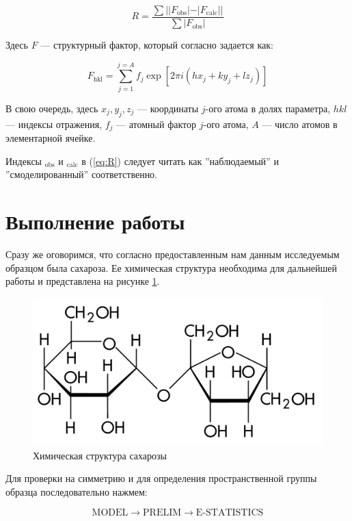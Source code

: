 \documentclass[a4paper, 12pt]{article}
\begin{document}
\begin{equation}
	R = \frac{\sum ||F_{\text{obs}}| - |F_{\text{calc}}||}{\sum |F_{\text{obs}}|}
	\label{eq:R}
\end{equation}

Здесь $F$ --- структурный фактор, который согласно \cite{Practicum} задается как:

\begin{equation}
	F_{\text{hkl}} = \sum_{j = 1}^{j = A} f_j \exp [2 \pi i (hx_{j} + ky_j + lz_j)]
\end{equation}

В свою очередь, здесь $x_j, y_j, z_j$ --- координаты $j$-ого атома в долях параметра, $hkl$ --- индексы отражения, $f_j$ --- атомный фактор $j$-ого атома, $A$ --- число атомов в элементарной ячейке.

Индексы $_{\text{obs}}$ и $_\text{calc}$ в (\ref{eq:R}) следует читать как ''наблюдаемый'' и ''смоделированный'' соответственно.

\section{Выполнение работы}

Сразу же оговоримся, что согласно предоставленным нам данным исследуемым образцом была сахароза. Ее химическая структура необходима для дальнейшей работы и представлена на рисунке \ref{fig:sucrose}.

\begin{figure}[H]
	\centering
	\includegraphics[width=0.7\linewidth]{sucrose}
	\caption{Химическая структура сахарозы}
	\label{fig:sucrose}
\end{figure}

Для проверки на симметрию и для определения пространственной группы образца последовательно нажмем:

\begin{equation*}
	\text{MODEL} \rightarrow \text{PRELIM} \rightarrow \text{E-STATISTICS}
\end{equation*}
\end{document}
